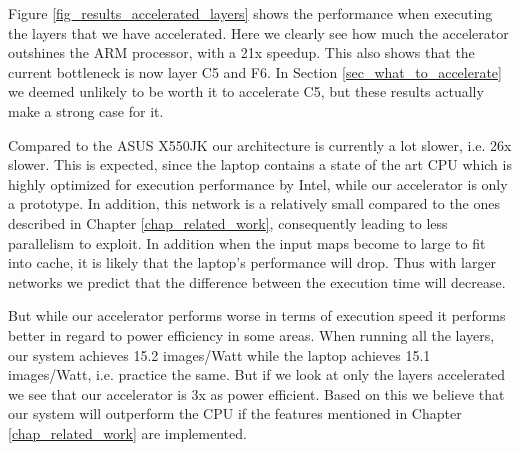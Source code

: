 Figure \ref{fig_results_accelerated_layers} shows the performance when executing the layers that we have accelerated. Here we clearly see how much the accelerator outshines the ARM processor, with a 21x speedup. This also shows that the current bottleneck is now layer C5 and F6. In Section \ref{sec_what_to_accelerate} we deemed unlikely to be worth it to accelerate C5, but these results actually make a strong case for it. 

Compared to the ASUS X550JK our architecture is currently a lot slower, i.e. 26x slower. This is expected, since the laptop contains a state of the art CPU which is highly optimized for execution performance by Intel, while our accelerator is only a prototype. In addition, this network is a relatively small compared to the ones described in Chapter \ref{chap_related_work}, consequently leading to less parallelism to exploit. In addition when the input maps become to large to fit into cache, it is likely that the laptop's performance will drop. Thus with larger networks we predict that the difference between the execution time will decrease.

But while our accelerator performs worse in terms of execution speed it performs better in regard to power efficiency in some areas. When running all the layers, our system achieves 15.2 images/Watt while the laptop achieves 15.1 images/Watt, i.e. practice the same. But if we look at only the layers accelerated we see that our accelerator is 3x as power efficient. Based on this we believe that our system will outperform the CPU if the features mentioned in Chapter \ref{chap_related_work} are implemented.  
